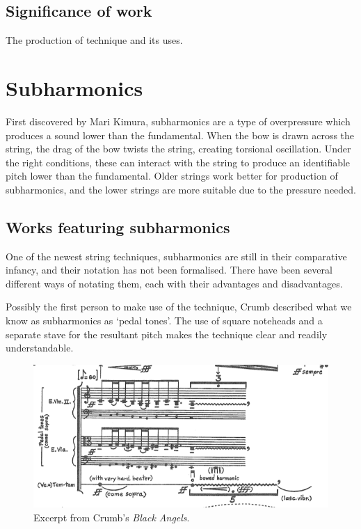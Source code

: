 \subsection{Significance of work}
The production of technique and its uses.

\section{Subharmonics}
First discovered by Mari Kimura, subharmonics are a type of overpressure which produces a sound lower than the fundamental.\autocite{kimuraHowProduceSubharmonics1999}  When the bow is drawn across the string, the drag of the bow twists the string, creating torsional oscillation. Under the right conditions, these can interact with the string to produce an identifiable pitch lower than the fundamental.\autocite{Subharmonics2006} Older strings work better for production of subharmonics, and the lower strings are more suitable due to the pressure needed.\autocite{kimuraHowProduceSubharmonics1999}


\subsection{Works featuring subharmonics}
One of the newest string techniques, subharmonics are still in their comparative infancy, and their notation has not been formalised. There have been several different ways of notating them, each with their advantages and disadvantages.



Possibly the first person to make use of the technique, Crumb described what we know as subharmonics as `pedal tones'.\autocite{crumbBlackAngelsImages1971} The use of square noteheads and a separate stave for the resultant pitch makes the technique clear and readily understandable.
\begin{figure}
    \includegraphics[width=\linewidth]{./resources/crumbBlackAngels.png}
    \caption{Excerpt from Crumb's \emph{Black Angels}.}
\label{fig:Excerpt from Crumb's Black Angels}
  \end{figure}

